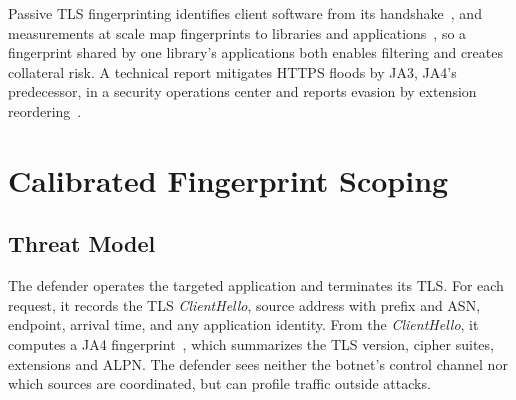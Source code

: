 \documentclass[conference,letterpaper,10pt]{IEEEtran}
\newcommand\1{\textit{(i)}}
\newcommand\2{\textit{(ii)}}
\newcommand\3{\textit{(iii)}}
\newcommand\4{\textit{(iv)}}
\newcommand\5{\textit{(v)}}
\newcommand\6{\textit{(vi)}}
\newcommand\7{\textit{(vii)}}
\newcommand\8{\textit{(viii)}}
\newcommand\9{\textit{(ix)}}
\begin{document}
Passive TLS fingerprinting identifies client software from its handshake~\cite{husak2016https}, and measurements at scale map fingerprints to libraries and applications~\cite{anderson2019tls,kotzias2018coming,razaghpanah2017studying}, so a fingerprint shared by one library's applications both enables filtering and creates collateral risk. A technical report mitigates HTTPS floods by JA3, JA4's predecessor, in a security operations center and reports evasion by extension reordering~\cite{kobayashi2024ja3}. 


\section{Calibrated Fingerprint Scoping}
\label{sec:approach}



\subsection{Threat Model}
\label{sec:threat}

The defender operates the targeted application and terminates its TLS.
For each request, it records the TLS \textit{ClientHello},
source address with prefix and ASN, endpoint,
arrival time, and any application identity.
From the \textit{ClientHello}, it computes a JA4
fingerprint~\cite{althouse2023ja4}, which summarizes
the TLS version, cipher suites, extensions and ALPN. 
The defender sees neither the botnet's control channel nor which
sources are coordinated, but can profile traffic outside attacks.
\end{document}
